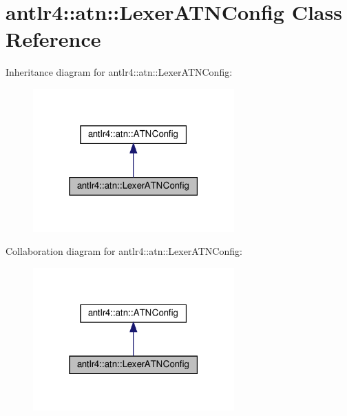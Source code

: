 \hypertarget{classantlr4_1_1atn_1_1LexerATNConfig}{}\section{antlr4\+:\+:atn\+:\+:Lexer\+A\+T\+N\+Config Class Reference}
\label{classantlr4_1_1atn_1_1LexerATNConfig}


Inheritance diagram for antlr4\+:\+:atn\+:\+:Lexer\+A\+T\+N\+Config\+:
\nopagebreak
\begin{figure}[H]
\begin{center}
\leavevmode
\includegraphics[width=219pt]{classantlr4_1_1atn_1_1LexerATNConfig__inherit__graph}
\end{center}
\end{figure}


Collaboration diagram for antlr4\+:\+:atn\+:\+:Lexer\+A\+T\+N\+Config\+:
\nopagebreak
\begin{figure}[H]
\begin{center}
\leavevmode
\includegraphics[width=219pt]{classantlr4_1_1atn_1_1LexerATNConfig__coll__graph}
\end{center}
\end{figure}
